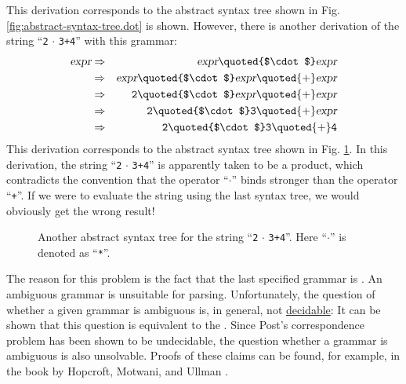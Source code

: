 This derivation corresponds to the abstract syntax tree shown in Fig.
\ref{fig:abstract-syntax-tree.dot}
is shown.  However, there is another derivation of the string ``\texttt{2$\,\cdot\,$3+4}'' with this grammar:
\begin{eqnarray*}
\textsl{expr} & \Rightarrow & \textsl{expr} \quoted{$\cdot$} \textsl{expr}                           \\
              & \Rightarrow & \textsl{expr} \quoted{$\cdot$} \textsl{expr} \quoted{+} \textsl{expr}  \\
              & \Rightarrow & \texttt{2} \quoted{$\cdot$} \textsl{expr} \quoted{+} \textsl{expr}     \\
              & \Rightarrow & \texttt{2} \quoted{$\cdot$} \texttt{3} \quoted{+} \textsl{expr}        \\
              & \Rightarrow & \texttt{2} \quoted{$\cdot$} \texttt{3} \quoted{+} \texttt{4}           
\end{eqnarray*}
This derivation corresponds to the abstract syntax tree shown in Fig.
\ref{fig:abstract-syntax-tree-prod.dot}.
In this derivation, the string ``\texttt{2$\,\cdot\,$3+4}'' is apparently taken to be a product,
which contradicts the convention that the operator ``\texttt{$\cdot$}'' binds stronger than the operator
``\texttt{+}''.  If we were to evaluate the string using the last syntax tree, we would
obviously get the wrong result! 
\begin{figure}[!ht]
  \centering
  \caption{Another abstract syntax tree for the string ``\texttt{2$\,\cdot\,$3+4}''. Here ``$\cdot$'' is
    denoted as ``\texttt{*}''.}
  \label{fig:abstract-syntax-tree-prod.dot}
\end{figure}
The reason for this problem is the fact that the last specified grammar is
. 
An ambiguous grammar is unsuitable for parsing.  Unfortunately, the question of whether a given
grammar is ambiguous is, in general, not
\href{http://en.wikipedia.org/wiki/Ambiguous_grammar#Recognizing_ambiguous_grammars}{decidable}:
It can be shown that this question is equivalent to the
\href{http://en.wikipedia.org/wiki/post_correspondence_problem}{}.
Since Post's correspondence problem has been shown to be undecidable,  the
question  whether a grammar is ambiguous is also unsolvable.
Proofs of these claims can be found, for example, in the book by Hopcroft, Motwani, and Ullman \cite{hopcroft:06}. 

